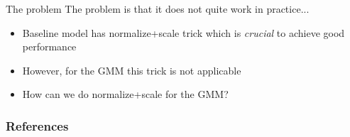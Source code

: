 \documentclass[handout, 10pt]{beamer}
\begin{document}
\begin{frame}{The problem}
The problem is that it does not quite work in practice...
\begin{itemize}
    \item Baseline model has normalize+scale trick which is \textit{crucial} to achieve good performance
    \item However, for the GMM this trick is not applicable
    \item How can we do normalize+scale for the GMM?
\end{itemize}
\end{frame}


\begin{frame}
    \frametitle{References}
    \printbibliography[heading=none]
\end{frame}
\end{document}
